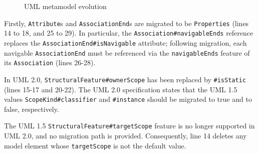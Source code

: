 \begin{landscape}	
\begin{figure}
	\centering
	\caption{UML metamodel evolution}
\label{fig:uml_mms}
\end{figure}
\end{landscape}	

Firstly, \texttt{At\-tr\-ib\-ut\-e}s and \texttt{As\-so\-ci\-at\-i\-onEn\-d}s are migrated to be \texttt{Pr\-o\-pe\-rt\-ies} (lines 14 to 18, and 25 to 29). In particular, the \texttt{As\-so\-ci\-at\-i\-on\#na\-vi\-ga\-b\-leEn\-ds} reference replaces the \texttt{As\-so\-ci\-at\-i\-onE\-nd\#isN\-av\-ig\-ab\-le} attribute; following migration, each navigable \texttt{As\-so\-ci\-at\-i\-onE\-nd} must be referenced via the \texttt{na\-vi\-ga\-bl\-eEn\-ds} feature of its \texttt{As\-so\-ci\-at\-ion} (lines 26-28).

In UML 2.0, \texttt{St\-ru\-ct\-ur\-alFe\-at\-ur\-e\#o\-wn\-er\-Sc\-op\-e} has been replaced by \texttt{\#i\-sS\-ta\-ti\-c} (lines 15-17 and 20-22). The UML 2.0 specification states that the UML 1.5 values \texttt{Sc\-op\-eKi\-nd\#cl\-as\-si\-fi\-er} and \texttt{\#i\-ns\-ta\-nce} should be migrated to true and to false, respectively. 

The UML 1.5 \texttt{St\-ru\-ct\-ur\-alFe\-at\-ur\-e\#t\-ar\-g\-et\-Sc\-op\-e} feature is no longer supported in UML 2.0, and no migration path is provided. Consequently, line 14 deletes any model element whose \texttt{t\-ar\-g\-et\-Sc\-op\-e} is not the default value.

